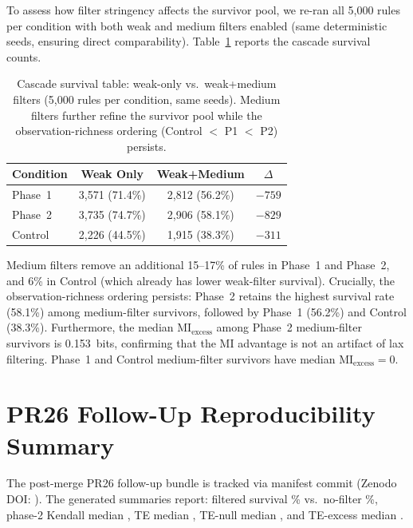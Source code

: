 \documentclass[letterpaper]{article}
\begin{document}
To assess how filter stringency affects the survivor pool, we re-ran
all 5{,}000 rules per condition with both weak and medium filters
enabled (same deterministic seeds, ensuring direct comparability).
Table~\ref{tab:cascade_survival} reports the cascade survival counts.

\begin{table}[htbp]
\centering
\caption{Cascade survival table: weak-only vs.\ weak+medium filters
(5{,}000 rules per condition, same seeds).  Medium filters further
refine the survivor pool while the observation-richness ordering
(Control $<$ P1 $<$ P2) persists.}
\label{tab:cascade_survival}
\begin{tabular}{lccc}
\toprule
Condition & Weak Only & Weak+Medium & $\Delta$ \\
\midrule
Phase~1 & 3{,}571 (71.4\%) & 2{,}812 (56.2\%) & $-759$ \\
Phase~2 & 3{,}735 (74.7\%) & 2{,}906 (58.1\%) & $-829$ \\
Control & 2{,}226 (44.5\%) & 1{,}915 (38.3\%) & $-311$ \\
\bottomrule
\end{tabular}
\end{table}

Medium filters remove an additional 15--17\% of rules in Phase~1 and
Phase~2, and 6\% in Control (which already has lower weak-filter
survival).  Crucially, the observation-richness ordering persists:
Phase~2 retains the highest survival rate (58.1\%) among medium-filter
survivors, followed by Phase~1 (56.2\%) and Control (38.3\%).
Furthermore, the median $\mathrm{MI}_{\mathrm{excess}}$ among Phase~2
medium-filter survivors is 0.153~bits, confirming that the MI advantage
is not an artifact of lax filtering.  Phase~1 and Control
medium-filter survivors have median $\mathrm{MI}_{\mathrm{excess}} = 0$.

\section{PR26 Follow-Up Reproducibility Summary}
\label{app:pr26_followups}

The post-merge PR26 follow-up bundle is tracked via manifest commit
\texttt{\PrTwentySixManifestCommit} (Zenodo DOI:
\texttt{\PrTwentySixManifestDoi}). The generated summaries report:
filtered survival \PrTwentySixFilteredSurvivalPct\% vs.\ no-filter
\PrTwentySixNoFilterSurvivalPct\%, phase-2 Kendall median
\PrTwentySixPhaseTwoKendallTauMedian, TE median
\PrTwentySixPhaseTwoTeMedian, TE-null median
\PrTwentySixPhaseTwoTeNullMedian, and TE-excess median
\PrTwentySixPhaseTwoTeExcessMedian.
\end{document}
